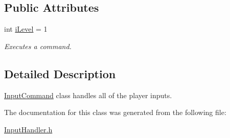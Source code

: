 \subsection*{Public Attributes}
\begin{DoxyCompactItemize}
\item 
\mbox{\label{class_input_command_aca351be0e5c76cb837f106ede2cb5755}} 
int \mbox{\hyperlink{class_input_command_aca351be0e5c76cb837f106ede2cb5755}{i\+Level}} = 1
\begin{DoxyCompactList}\small\item\em Executes a command. \end{DoxyCompactList}\end{DoxyCompactItemize}


\subsection{Detailed Description}
\mbox{\hyperlink{class_input_command}{Input\+Command}} class handles all of the player inputs. 

The documentation for this class was generated from the following file\+:\begin{DoxyCompactItemize}
\item 
\mbox{\hyperlink{_input_handler_8h}{Input\+Handler.\+h}}\end{DoxyCompactItemize}

